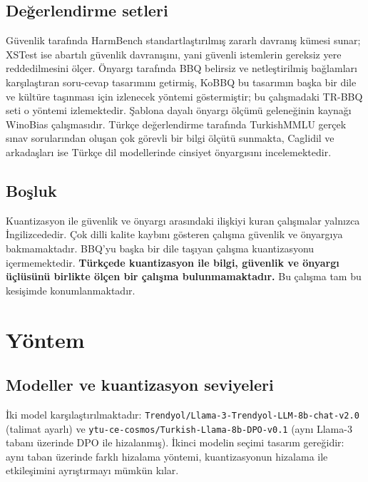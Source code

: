 \documentclass[conference]{IEEEtran}
\begin{document}
\subsection{Değerlendirme setleri}

Güvenlik tarafında HarmBench \cite{mazeika2024harmbench} standartlaştırılmış
zararlı davranış kümesi sunar; XSTest \cite{rottger2024xstest} ise abartılı
güvenlik davranışını, yani güvenli istemlerin gereksiz yere reddedilmesini
ölçer. Önyargı tarafında BBQ \cite{parrish2022bbq} belirsiz ve netleştirilmiş
bağlamları karşılaştıran soru-cevap tasarımını getirmiş, KoBBQ
\cite{jin2024kobbq} bu tasarımın başka bir dile ve kültüre taşınması için
izlenecek yöntemi göstermiştir; bu çalışmadaki TR-BBQ seti o yöntemi
izlemektedir. Şablona dayalı önyargı ölçümü geleneğinin kaynağı WinoBias
\cite{zhao2018gender} çalışmasıdır. Türkçe değerlendirme tarafında TurkishMMLU
\cite{yuksel2024turkishmmlu} gerçek sınav sorularından oluşan çok görevli bir
bilgi ölçütü sunmakta, Caglidil ve arkadaşları \cite{caglidil2024gender} ise
Türkçe dil modellerinde cinsiyet önyargısını incelemektedir.

\subsection{Boşluk}

Kuantizasyon ile güvenlik ve önyargı arasındaki ilişkiyi kuran çalışmalar
\cite{hong2024decoding,egashira2024exploiting,kumar2024finetuning} yalnızca
İngilizcededir. Çok dilli kalite kaybını gösteren çalışma
\cite{marchisio2024quantization} güvenlik ve önyargıya bakmamaktadır. BBQ'yu
başka bir dile taşıyan çalışma \cite{jin2024kobbq} kuantizasyonu
içermemektedir. \textbf{Türkçede kuantizasyon ile bilgi, güvenlik ve önyargı
üçlüsünü birlikte ölçen bir çalışma bulunmamaktadır.} Bu çalışma tam bu
kesişimde konumlanmaktadır.

\section{Yöntem}

\subsection{Modeller ve kuantizasyon seviyeleri}

İki model karşılaştırılmaktadır: \texttt{Trendyol/Llama-3-Trendyol-LLM-8b-chat-v2.0}
(talimat ayarlı) ve \texttt{ytu-ce-cosmos/Turkish-Llama-8b-DPO-v0.1} (aynı
Llama-3 tabanı üzerinde DPO ile hizalanmış). İkinci modelin seçimi tasarım
gereğidir: aynı taban üzerinde farklı hizalama yöntemi, kuantizasyonun hizalama
ile etkileşimini ayrıştırmayı mümkün kılar.
\end{document}
